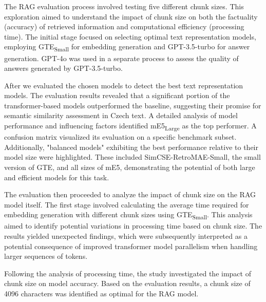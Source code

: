 The \ac{RAG} evaluation process involved testing five different chunk sizes.
This exploration aimed to understand the impact of chunk size on both the factuality (accuracy) of retrieved information and computational efficiency (processing time).
The initial stage focused on selecting optimal text representation models, employing \ac{GTE}\textsubscript{Small} for embedding generation and GPT-3.5-turbo for answer generation.
GPT-4o was used in a separate process to assess the quality of answers generated by GPT-3.5-turbo.

After we evaluated the chosen models to detect the best text representation models.
The evaluation results revealed that a significant portion of the transformer-based models outperformed the baseline, suggesting their promise for semantic similarity assessment in Czech text.
A detailed analysis of model performance and influencing factors identified \ac{mE5}\textsubscript{Large} as the top performer.
A confusion matrix visualized its evaluation on a specific benchmark subset.
Additionally, "balanced models" exhibiting the best performance relative to their model size were highlighted.
These included SimCSE-RetroMAE-Small, the small version of \ac{GTE}, and all sizes of \ac{mE5}, demonstrating the potential of both large and efficient models for this task.

The evaluation then proceeded to analyze the impact of chunk size on the \ac{RAG} model itself.
The first stage involved calculating the average time required for embedding generation with different chunk sizes using \ac{GTE}\textsubscript{Small}.
This analysis aimed to identify potential variations in processing time based on chunk size.
The results yielded unexpected findings, which were subsequently interpreted as a potential consequence of improved transformer model parallelism when handling larger sequences of tokens.

Following the analysis of processing time, the study investigated the impact of chunk size on model accuracy.
Based on the evaluation results, a chunk size of 4096 characters was identified as optimal for the \ac{RAG} model.



